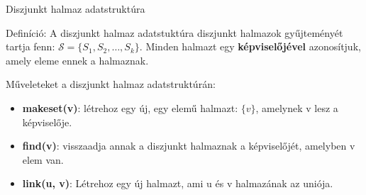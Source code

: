 \begin{frame}{Diszjunkt halmaz adatstruktúra}
  \begin{block}{Definíció:}
    A diszjunkt halmaz adatstuktúra diszjunkt halmazok gyűjteményét tartja fenn: $\mathcal{S} = \{ S_1, S_2, \ldots, S_k \}$.
    Minden halmazt egy \textbf{képviselőjével} azonosítjuk, amely eleme ennek a halmaznak.
  \end{block}
  Műveleteket a diszjunkt halmaz adatstruktúrán:
  \begin{itemize}
    \item \textbf{makeset(v)}: létrehoz egy új, egy elemű halmazt: $ \{ v \} $, amelynek v lesz a képviselője. 
    \item \textbf{find(v)}: visszaadja annak a diszjunkt halmaznak a képviselőjét, amelyben v elem van.
    \item \textbf{link(u, v)}: Létrehoz egy új halmazt, ami u és v halmazának az uniója. 
  \end{itemize}
\end{frame}